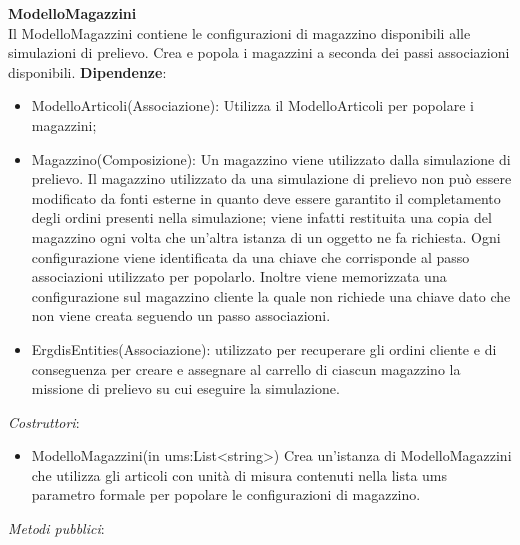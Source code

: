 \textbf{ModelloMagazzini}\\
Il ModelloMagazzini contiene le configurazioni di magazzino disponibili alle simulazioni di prelievo.
Crea e popola i magazzini a seconda dei passi associazioni disponibili.
\textbf{Dipendenze}:
\begin{itemize}
    \item ModelloArticoli(Associazione): Utilizza il ModelloArticoli per popolare i magazzini;\\
    \item Magazzino(Composizione): Un magazzino viene utilizzato dalla simulazione di prelievo. Il magazzino utilizzato da una simulazione di prelievo non può essere modificato 
    da fonti esterne in quanto deve essere garantito il completamento degli ordini presenti nella simulazione; viene infatti restituita una copia del magazzino ogni volta che un'altra 
    istanza di un oggetto ne fa richiesta.
    Ogni configurazione viene identificata da una chiave che corrisponde al passo associazioni utilizzato per popolarlo.
    Inoltre viene memorizzata una configurazione sul magazzino cliente la quale non richiede una chiave dato che non viene creata seguendo un passo associazioni.
    \item ErgdisEntities(Associazione): utilizzato per recuperare gli ordini cliente e di conseguenza per creare e assegnare al carrello di ciascun magazzino la missione di prelievo su cui eseguire la simulazione.\\
\end{itemize}
\textit{Costruttori}:\\
\begin{itemize}
    \item ModelloMagazzini(in ums:List<string>)
    Crea un'istanza di ModelloMagazzini che utilizza gli articoli con unità di misura contenuti nella lista ums parametro formale per popolare le configurazioni di magazzino.
\end{itemize}
\textit{Metodi pubblici}:\\
